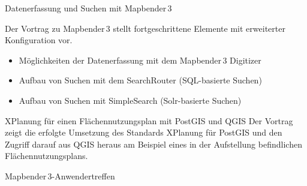 %
{Datenerfassung und Suchen mit Mapbender\,3}%
{}%
{Der Vortrag zu Mapbender\,3 stellt fortgeschrittene Elemente mit erweiterter Konfiguration vor. 
\begin{itemize}
\RaggedRight
\setlength{\itemsep}{-2pt} %
 \item Möglichkeiten der Datenerfassung mit dem Mapbender\,3 Digitizer
 \item Aufbau von Suchen mit dem SearchRouter (SQL-basierte Suchen)
 \item Aufbau von Suchen mit SimpleSearch (Solr-basierte Suchen)
\end{itemize}
\justifying%
}

%
{XPlanung für einen Flächennutzungsplan mit PostGIS und QGIS}%
{}%
{Der Vortrag zeigt die erfolgte Umsetzung des Standards XPlanung für PostGIS und den Zugriff darauf aus
QGIS heraus am Beispiel eines in der Aufstellung befindlichen Flächennutzungsplans. }

\enlargethispage{4\baselineskip}
\label{bof-dienstag}
%
{Mapbender\,3-Anwendertreffen}%
{}%
{%
}
